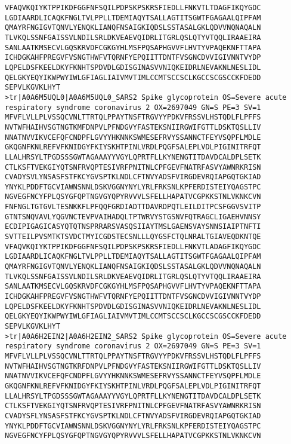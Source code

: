 \documentclass[en,black,12pt,normal]{elegantnote}
\begin{document}
\begin{lstlisting}
VFAQVKQIYKTPPIKDFGGFNFSQILPDPSKPSKRSFIEDLLFNKVTLTDAGFIKQYGDC
LGDIAARDLICAQKFNGLTVLPPLLTDEMIAQYTSALLAGTITSGWTFGAGAALQIPFAM
QMAYRFNGIGVTQNVLYENQKLIANQFNSAIGKIQDSLSSTASALGKLQDVVNQNAQALN
TLVKQLSSNFGAISSVLNDILSRLDKVEAEVQIDRLITGRLQSLQTYVTQQLIRAAEIRA
SANLAATKMSECVLGQSKRVDFCGKGYHLMSFPQSAPHGVVFLHVTYVPAQEKNFTTAPA
ICHDGKAHFPREGVFVSNGTHWFVTQRNFYEPQIITTDNTFVSGNCDVVIGIVNNTVYDP
LQPELDSFKEELDKYFKNHTSPDVDLGDISGINASVVNIQKEIDRLNEVAKNLNESLIDL
QELGKYEQYIKWPWYIWLGFIAGLIAIVMVTIMLCCMTSCCSCLKGCCSCGSCCKFDEDD
SEPVLKGVKLHYT
>tr|A0A6M5UQL0|A0A6M5UQL0_SARS2 Spike glycoprotein OS=Severe acute respiratory syndrome coronavirus 2 OX=2697049 GN=S PE=3 SV=1
MFVFLVLLPLVSSQCVNLTTRTQLPPAYTNSFTRGVYYPDKVFRSSVLHSTQDLFLPFFS
NVTWFHAIHVSGTNGTKMFDNPVLPFNDGVYFASTEKSNIIRGWIFGTTLDSKTQSLLIV
NNATNVVIKVCEFQFCNDPFLGVYYHKNNKSWMESEFRVYSSANNCTFEYVSQPFLMDLE
GKQGNFKNLREFVFKNIDGYFKIYSKHTPINLVRDLPQGFSALEPLVDLPIGINITRFQT
LLALHRSYLTPGDSSSGWTAGAAAYYVGYLQPRTFLLKYNENGTITDAVDCALDPLSETK
CTLKSFTVEKGIYQTSNFRVQPTESIVRFPNITNLCPFGEVFNATRFASVYAWNRKRISN
CVADYSVLYNSASFSTFKCYGVSPTKLNDLCFTNVYADSFVIRGDEVRQIAPGQTGKIAD
YNYKLPDDFTGCVIAWNSNNLDSKVGGNYNYLYRLFRKSNLKPFERDISTEIYQAGSTPC
NGVEGFNCYFPLQSYGFQPTNGVGYQPYRVVVLSFELLHAPATVCGPKKSTNLVKNKCVN
FNFNGLTGTGVLTESNKKFLPFQQFGRDIADTTDAVRDPQTLEILDITPCSFGGVSVITP
GTNTSNQVAVLYQGVNCTEVPVAIHADQLTPTWRVYSTGSNVFQTRAGCLIGAEHVNNSY
ECDIPIGAGICASYQTQTNSPRRARSVASQSIIAYTMSLGAENSVAYSNNSIAIPTNFTI
SVTTEILPVSMTKTSVDCTMYICGDSTECSNLLLQYGSFCTQLNRALTGIAVEQDKNTQE
VFAQVKQIYKTPPIKDFGGFNFSQILPDPSKPSKRSFIEDLLFNKVTLADAGFIKQYGDC
LGDIAARDLICAQKFNGLTVLPPLLTDEMIAQYTSALLAGTITSGWTFGAGAALQIPFAM
QMAYRFNGIGVTQNVLYENQKLIANQFNSAIGKIQDSLSSTASALGKLQDVVNQNAQALN
TLVKQLSSNFGAISSVLNDILSRLDKVEAEVQIDRLITGRLQSLQTYVTQQLIRAAEIRA
SANLAATKMSECVLGQSKRVDFCGKGYHLMSFPQSAPHGVVFLHVTYVPAQEKNFTTAPA
ICHDGKAHFPREGVFVSNGTHWFVTQRNFYEPQIITTDNTFVSGNCDVVIGIVNNTVYDP
LQPELDSFKEELDKYFKNHTSPDVDLGDISGINASVVNIQKEIDRLNEVAKNLNESLIDL
QELGKYEQYIKWPWYIWLGFIAGLIAIVMVTIMLCCMTSCCSCLKGCCSCGSCCKFDEDD
SEPVLKGVKLHYT
>tr|A0A6H2EIN2|A0A6H2EIN2_SARS2 Spike glycoprotein OS=Severe acute respiratory syndrome coronavirus 2 OX=2697049 GN=S PE=3 SV=1
MFVFLVLLPLVSSQCVNLTTRTQLPPAYTNSFTRGVYYPDKVFRSSVLHSTQDLFLPFFS
NVTWFHAIHVSGTNGTKRFDNPVLPFNDGVYFASTEKSNIIRGWIFGTTLDSKTQSLLIV
NNATNVVIKVCEFQFCNDPFLGVYYHKNNKSWMESEFRVYSSANNCTFEYVSQPFLMDLE
GKQGNFKNLREFVFKNIDGYFKIYSKHTPINLVRDLPQGFSALEPLVDLPIGINITRFQT
LLALHRSYLTPGDSSSGWTAGAAAYYVGYLQPRTFLLKYNENGTITDAVDCALDPLSETK
CTLKSFTVEKGIYQTSNFRVQPTESIVRFPNITNLCPFGEVFNATRFASVYAWNRKRISN
CVADYSFLYNSASFSTFKCYGVSPTKLNDLCFTNVYADSFVIRGDEVRQIAPGQTGKIAD
YNYKLPDDFTGCVIAWNSNNLDSKVGGNYNYLYRLFRKSNLKPFERDISTEIYQAGSTPC
NGVEGFNCYFPLQSYGFQPTNGVGYQPYRVVVLSFELLHAPATVCGPKKSTNLVKNKCVN

\end{lstlisting}
\end{document}
